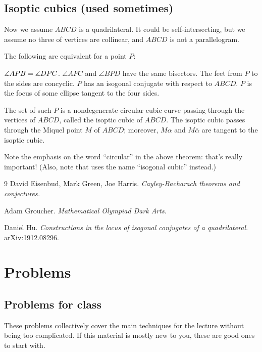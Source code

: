 \documentclass[11pt]{scrartcl}
\begin{document}
\subsection{Isoptic cubics (used sometimes)}
Now we assume $ABCD$ is a quadrilateral.
It could be self-intersecting, but we assume no three of vertices are collinear,
and $ABCD$ is not a parallelogram.
\begin{theorem}
  [{\cite[Theorem 1.5]{Hu}}]
  The following are equivalent for a point $P$:
  \begin{enumerate}[(i)]
    \itemsep1pt
    \ii $\measuredangle APB = \measuredangle DPC$.
    \ii $\angle APC$ and $\angle BPD$ have the same bisectors.
    \ii The feet from $P$ to the sides are concyclic.
    \ii $P$ has an isogonal conjugate with respect to $ABCD$.
    \ii $P$ is the focus of some ellipse tangent to the four sides.
  \end{enumerate}
\end{theorem}
\begin{theorem}
  The set of such $P$ is a nondegenerate \alert{circular} cubic curve
  passing through the vertices of $ABCD$,
  called the \alert{isoptic cubic}
  of $ABCD$.
  The isoptic cubic passes through the Miquel point $M$ of $ABCD$;
  moreover, $M\alpha$ and $M\bar\alpha$ are tangent to the isoptic cubic.
\end{theorem}
Note the emphasis on the word ``circular'' in the above theorem:
that's really important!
(Also, note that \cite{Hu} uses the name ``isogonal cubic'' instead.)

\begin{thebibliography}{9}
  David Eisenbud, Mark Green, Joe Harris.
  \textit{Cayley-Bacharach theorems and conjectures.}

  Adam Groucher. \textit{Mathematical Olympiad Dark Arts}.

  Daniel Hu. \textit{Constructions in the locus of isogonal conjugates of a quadrilateral}.
  arXiv:1912.08296.
\end{thebibliography}

\newpage

\section{Problems}
\subsection{Problems for class}
These problems collectively cover the main techniques for the lecture
without being too complicated.
If this material is mostly new to you, these are good ones to start with.
\end{document}
